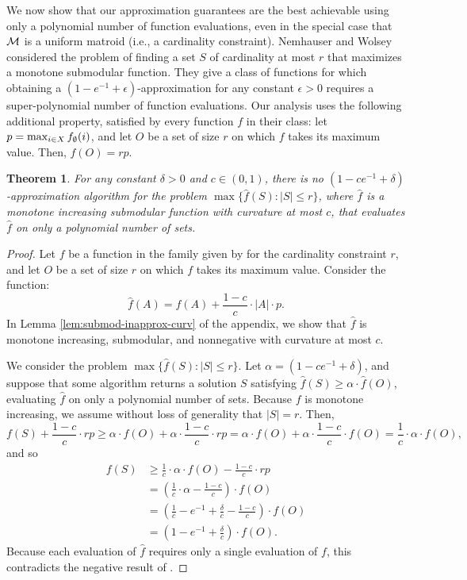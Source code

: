 \documentclass{article}
\newtheorem{theorem}{Theorem}[section]
\theoremstyle{definition}
\begin{document}
We now show that our approximation guarantees are the best achievable using only a polynomial number of function evaluations, even in the special case that $\mathcal{M}$ is a uniform matroid (i.e., a cardinality constraint).  Nemhauser and Wolsey \cite{Nemhauser1978} considered the problem of finding a set $S$ of cardinality at most $r$ that maximizes a monotone submodular function. They give a class of functions for which obtaining a $(1 - e^{-1} + \epsilon)$-approximation for any constant $\epsilon > 0$ requires a super-polynomial number of function evaluations. Our analysis uses the following additional property, satisfied by every function $f$ in their class: let $p = \max_{i \in X}f_{\emptyset}(i)$, and let $O$ be a set of size $r$ on which $f$ takes its maximum value.  Then, $f(O) = rp$.
\begin{theorem}
\label{lem:submod-inapprox}
For any constant $\delta > 0$ and $c \in (0,1)$, there is no $(1 - c e^{-1} + \delta)$-approximation algorithm for the problem $\max \{ \hat{f}(S) : |S| \le r \}$, where $\hat{f}$ is a monotone increasing submodular function with curvature at most $c$, that evaluates $\hat{f}$ on only a polynomial number of sets.
\end{theorem}
\begin{proof}
Let $f$ be a function in the family given by \cite{Nemhauser1978} for the cardinality constraint $r$, and let $O$ be a set of size $r$ on which $f$ takes its maximum value.  Consider the function: \[\hat{f}(A) = f(A) + \frac{1 - c}{c}\cdot |A|\cdot p.\]   In Lemma \ref{lem:submod-inapprox-curv} of the appendix, we show that $\hat{f}$ is monotone increasing, submodular, and nonnegative with curvature at most $c$.

We consider the problem $\max\{\hat{f}(S) : |S| \le r\}$.  Let $\alpha = (1 - ce^{-1} + \delta)$, and suppose that some algorithm returns a solution $S$ satisfying $\hat{f}(S) \ge \alpha \cdot \hat{f}(O)$, evaluating $\hat{f}$ on only a polynomial number of sets.  Because $f$ is monotone increasing, we assume without loss of generality that $|S| = r$. Then,
\begin{equation*}
f(S) + \frac{1 - c}{c}\cdot rp \ge \alpha \cdot f(O) + \alpha \cdot \frac{1 - c}{c}\cdot rp
= \alpha \cdot f(O) + \alpha \cdot \frac{1 - c}{c}\cdot f(O) = \frac{1}{c}\cdot \alpha \cdot f(O),
\end{equation*}
and so
\begin{align*}
f(S) &\ge \frac{1}{c}\cdot \alpha \cdot f(O) - \frac{1-c}{c}\cdot rp \\
&= \left(\frac{1}{c}\cdot \alpha - \frac{1-c}{c}\right)\cdot f(O) \\
 &= \left(\frac{1}{c} - e^{-1} + \frac{\delta}{c} - \frac{1-c}{c}\right)\cdot f(O) \\ 
&= \left(1 - e^{-1} + \frac{\delta}{c}\right)\cdot f(O). 
\end{align*}
Because each evaluation of $\hat{f}$ requires only a single evaluation of $f$, this contradicts the negative result of \cite{Nemhauser1978}.
\end{proof}
\end{document}
